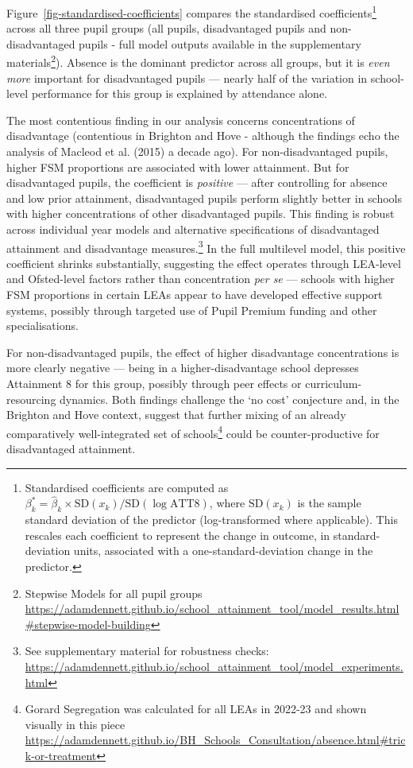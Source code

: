 \documentclass[
  12pt,
  titlepage]{article}
\begin{document}
Figure~\ref{fig-standardised-coefficients} compares the standardised
coefficients\footnote{Standardised coefficients are computed as
  \(\beta^*_k = \hat{\beta}_k \times \text{SD}(x_k) / \text{SD}(\log \text{ATT8})\),
  where \(\text{SD}(x_k)\) is the sample standard deviation of the
  predictor (log-transformed where applicable). This rescales each
  coefficient to represent the change in outcome, in standard-deviation
  units, associated with a one-standard-deviation change in the
  predictor.} across all three pupil groups (all pupils, disadvantaged
pupils and non-disadvantaged pupils - full model outputs available in
the supplementary materials\footnote{Stepwise Models for all pupil
  groups
  \url{https://adamdennett.github.io/school_attainment_tool/model_results.html\#stepwise-model-building}}).
Absence is the dominant predictor across all groups, but it is
\emph{even more} important for disadvantaged pupils --- nearly half of
the variation in school-level performance for this group is explained by
attendance alone.

The most contentious finding in our analysis concerns concentrations of
disadvantage (contentious in Brighton and Hove - although the findings
echo the analysis of Macleod et al. (2015) a decade ago). For
non-disadvantaged pupils, higher FSM proportions are associated with
lower attainment. But for disadvantaged pupils, the coefficient is
\emph{positive} --- after controlling for absence and low prior
attainment, disadvantaged pupils perform slightly better in schools with
higher concentrations of other disadvantaged pupils. This finding is
robust across individual year models and alternative specifications of
disadvantaged attainment and disadvantage measures.\footnote{See
  supplementary material for robustness checks:
  \url{https://adamdennett.github.io/school_attainment_tool/model_experiments.html}}
In the full multilevel model, this positive coefficient shrinks
substantially, suggesting the effect operates through LEA-level and
Ofsted-level factors rather than concentration \emph{per se} --- schools
with higher FSM proportions in certain LEAs appear to have developed
effective support systems, possibly through targeted use of Pupil
Premium funding and other specialisations.

For non-disadvantaged pupils, the effect of higher disadvantage
concentrations is more clearly negative --- being in a
higher-disadvantage school depresses Attainment 8 for this group,
possibly through peer effects or curriculum-resourcing dynamics. Both
findings challenge the `no cost' conjecture and, in the Brighton and
Hove context, suggest that further mixing of an already comparatively
well-integrated set of schools\footnote{Gorard Segregation was
  calculated for all LEAs in 2022-23 and shown visually in this piece
  \url{https://adamdennett.github.io/BH_Schools_Consultation/absence.html\#trick-or-treatment}}
could be counter-productive for disadvantaged attainment.
\end{document}
